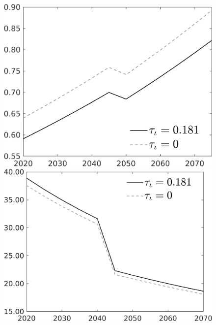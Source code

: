 \documentclass[12pt]{article}
\begin{document}
\begin{figure}[h!!]
\begin{minipage}[]{0.32\textwidth}
\end{minipage}	
\begin{minipage}[]{0.32\textwidth}
\includegraphics[width=1\textwidth]{../../codding_model/own_basedOnFried/optimalPol_010922_revision/figures/all_13Sept22/CompTauf_bytaul_Reg0_C_spillover0_nsk0_xgr0_knspil1_sep1_LFlimit1_emsbase0_countec0_GovRev0_etaa0.79_lgd1.png}
\end{minipage}	
\begin{minipage}[]{0.32\textwidth}
\includegraphics[width=1\textwidth]{../../codding_model/own_basedOnFried/optimalPol_010922_revision/figures/all_13Sept22/CompTauf_bytaul_Reg0_gAf_spillover0_nsk0_xgr0_knspil1_sep1_LFlimit1_emsbase0_countec0_GovRev0_etaa0.79_lgd1.png}

\end{minipage}
\end{figure}
\end{document}
